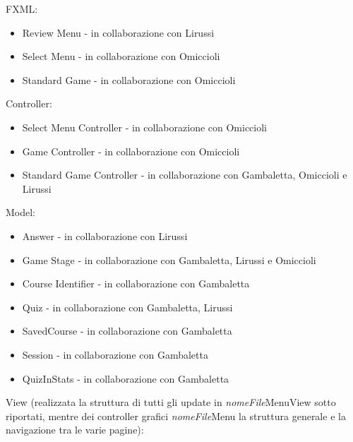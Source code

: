     FXML:
    \begin{itemize}
        \item Review Menu - in collaborazione con Lirussi
        \item Select Menu - in collaborazione con Omiccioli
        \item Standard Game - in collaborazione con Omiccioli
    \end{itemize}
    Controller:
    \begin{itemize}
        \item Select Menu Controller - in collaborazione con Omiccioli
        \item Game Controller - in collaborazione con Omiccioli
        \item Standard Game Controller - in collaborazione con Gambaletta, Omiccioli e Lirussi
    \end{itemize}
    Model:
    \begin{itemize}
        \item Answer - in collaborazione con Lirussi
        \item Game Stage - in collaborazione con Gambaletta, Lirussi e Omiccioli
        \item Course Identifier - in collaborazione con Gambaletta
        \item Quiz - in collaborazione con Gambaletta, Lirussi
        \item SavedCourse - in collaborazione con Gambaletta
        \item Session - in collaborazione con Gambaletta
        \item QuizInStats - in collaborazione con Gambaletta
    \end{itemize}
    View (realizzata la struttura di tutti gli update in \textit{nomeFile}MenuView sotto riportati, mentre dei controller grafici \textit{nomeFile}Menu la struttura generale e la navigazione tra le varie pagine):

